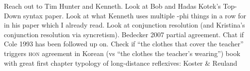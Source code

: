 
\pex \a Reach out to Tim Hunter and Kenneth.
    \a Look at Bob and Hadas Kotek's Top-Down syntax paper.
    \a Look at what Kenneth uses multiple -phi things in a row for in his paper which I already read.
    \a Look at conjunction resolution (and Kristina's conjunction resolution via syncretism).
    \a Bedecker 2007 partial agreement.
    \a Chat if Cole 1993 has been followed up on.
    \a Check if ``the clothes that cover the teacher'' triggers \textsc{hon} agreement in Korean (vs ``the clothes the teacher's wearing'')
    \a book with great first chapter typology of long-distance reflexives: Koster \& Reuland
\xe
